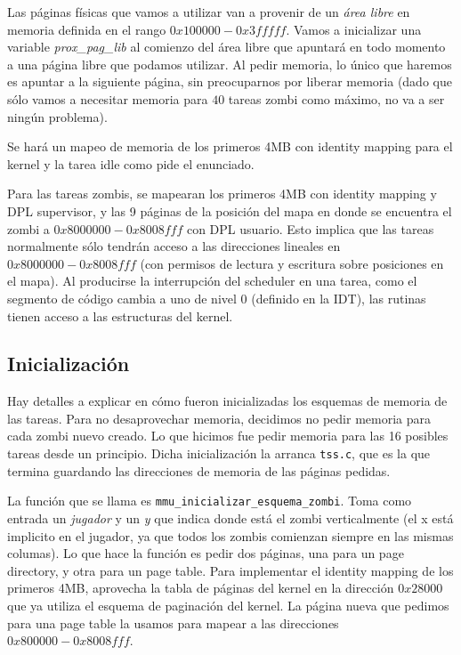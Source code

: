 \documentclass{article}
\begin{document}
	Las páginas físicas que vamos a utilizar van a provenir de un \textit{área libre} en memoria definida en el rango $0x100000 - 0x3fffff$. Vamos a inicializar una variable \textit{prox\_pag\_lib} al comienzo del área libre que apuntará en todo momento a una página libre que podamos utilizar. Al pedir memoria, lo único que haremos es apuntar a la siguiente página, sin preocuparnos por liberar memoria (dado que sólo vamos a necesitar memoria para $40$ tareas zombi como máximo, no va a ser ningún problema).
	
	Se hará un mapeo de memoria de los primeros 4MB con identity mapping para el kernel y la tarea idle como pide el enunciado.
	
	Para las tareas zombis, se mapearan los primeros 4MB con identity mapping y DPL supervisor, y las 9 páginas de la posición del mapa en donde se encuentra el zombi a $0x8000000 - 0x8008fff$ con DPL usuario. Esto implica que las tareas normalmente sólo tendrán acceso a las direcciones lineales en $0x8000000 - 0x8008fff$ (con permisos de lectura y escritura sobre posiciones en el mapa). Al producirse la interrupción del scheduler en una tarea, como el segmento de código cambia a uno de nivel 0 (definido en la IDT), las rutinas tienen acceso a las estructuras del kernel.
	
	\subsection{Inicialización}
	
	Hay detalles a explicar en cómo fueron inicializadas los esquemas de memoria de las tareas. Para no desaprovechar memoria, decidimos no pedir memoria para cada zombi nuevo creado. Lo que hicimos fue pedir memoria para las 16 posibles tareas desde un principio. Dicha inicialización la arranca \texttt{tss.c}, que es la que termina guardando las direcciones de memoria de las páginas pedidas.
	
	La función que se llama es \texttt{mmu\_inicializar\_esquema\_zombi}. Toma como entrada un \textit{jugador} y un \textit{y} que indica donde está el zombi verticalmente (el x está implicito en el jugador, ya que todos los zombis comienzan siempre en las mismas columas). Lo que hace la función es pedir dos páginas, una para un page directory, y otra para un page table. Para implementar el identity mapping de los primeros 4MB, aprovecha la tabla de páginas del kernel en la dirección $0x28000$ que ya utiliza el esquema de paginación del kernel. La página nueva que pedimos para una page table la usamos para mapear a las direcciones $0x800000- 0x8008fff$.
	
\end{document}
